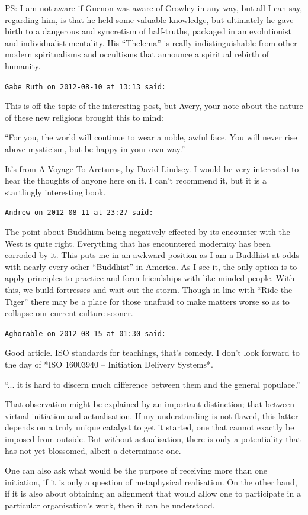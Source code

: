 \begin{footnotesize}
\begin{sffamily}
PS: I am not aware if Guenon was aware of Crowley in any way, but all I can say, regarding him, is that he held some valuable knowledge, but ultimately he gave birth to a dangerous and syncretism of half-truths, packaged in an evolutionist and individualist mentality. His ``Thelema'' is really indistinguishable from other modern spiritualisms and occultisms that announce a spiritual rebirth of humanity.

\hfill

\texttt{Gabe Ruth on 2012-08-10 at 13:13 said:}

This is off the topic of the interesting post, but Avery, your note about the nature of these new religions brought this to mind:

``For you, the world will continue to wear a noble, awful face. You will never rise above mysticism, but be happy in your own way.''

It's from A Voyage To Arcturus, by David Lindsey. I would be very interested to hear the thoughts of anyone here on it. I can't recommend it, but it is a startlingly interesting book.

\hfill

\texttt{Andrew on 2012-08-11 at 23:27 said:}

The point about Buddhism being negatively effected by its encounter with the West is quite right. Everything that has encountered modernity has been corroded by it. This puts me in an awkward position as I am a Buddhist at odds with nearly every other ``Buddhist'' in America. As I see it, the only option is to apply principles to practice and form friendships with like-minded people. With this, we build fortresses and wait out the storm. Though in line with ``Ride the Tiger'' there may be a place for those unafraid to make matters worse so as to collapse our current culture sooner.

\hfill

\texttt{Aghorable on 2012-08-15 at 01:30 said:}

Good article. ISO standards for teachings, that's comedy. I don't look forward to the day of *ISO 16003940 -- Initiation Delivery Systems*.

``... it is hard to discern much difference between them and the general populace.''

That observation might be explained by an important distinction; that between virtual initiation and actualisation. If my understanding is not flawed, this latter depends on a truly unique catalyst to get it started, one that cannot exactly be imposed from outside. But without actualisation, there is only a potentiality that has not yet blossomed, albeit a determinate one.

One can also ask what would be the purpose of receiving more than one initiation, if it is only a question of metaphysical realisation. On the other hand, if it is also about obtaining an alignment that would allow one to participate in a particular organisation's work, then it can be understood.


\hfill

\end{sffamily}
\end{footnotesize}


